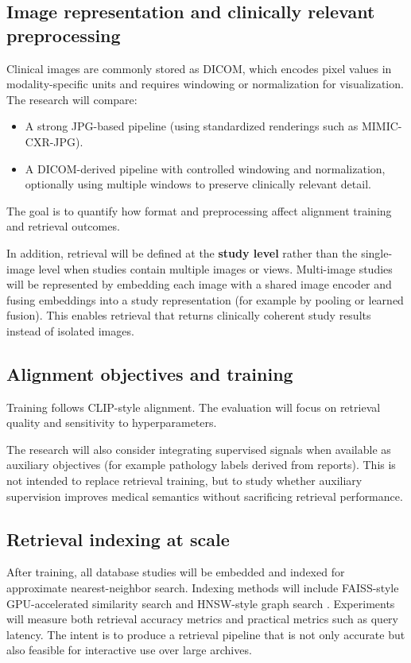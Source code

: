 \documentclass[11pt,a4paper]{article}
\begin{document}
\subsection{Image representation and clinically relevant preprocessing}
Clinical images are commonly stored as DICOM, which encodes pixel values in modality-specific units and requires windowing or normalization for visualization. The research will compare:
\begin{itemize}
    \item A strong JPG-based pipeline (using standardized renderings such as MIMIC-CXR-JPG).
    \item A DICOM-derived pipeline with controlled windowing and normalization, optionally using multiple windows to preserve clinically relevant detail.
\end{itemize}
The goal is to quantify how format and preprocessing affect alignment training and retrieval outcomes.

In addition, retrieval will be defined at the \textbf{study level} rather than the single-image level when studies contain multiple images or views. Multi-image studies will be represented by embedding each image with a shared image encoder and fusing embeddings into a study representation (for example by pooling or learned fusion). This enables retrieval that returns clinically coherent study results instead of isolated images.

\subsection{Alignment objectives and training}
Training follows CLIP-style alignment.
The evaluation will focus on retrieval quality and sensitivity to hyperparameters.

The research will also consider integrating supervised signals when available as auxiliary objectives (for example pathology labels derived from reports). This is not intended to replace retrieval training, but to study whether auxiliary supervision improves medical semantics without sacrificing retrieval performance.

\subsection{Retrieval indexing at scale}
After training, all database studies will be embedded and indexed for approximate nearest-neighbor search. Indexing methods will include FAISS-style GPU-accelerated similarity search \cite{johnson2017billionscalesimilaritysearchgpus} and HNSW-style graph search \cite{malkov2018efficientrobustapproximatenearest}. Experiments will measure both retrieval accuracy metrics and practical metrics such as query latency. The intent is to produce a retrieval pipeline that is not only accurate but also feasible for interactive use over large archives.
\end{document}
